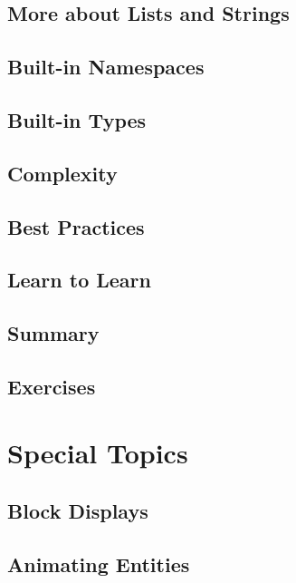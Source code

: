 \documentclass[oneside]{book}
\begin{document}
\section{More about Lists and Strings}
\blindtext

\section{Built-in Namespaces}
\blindtext

\section{Built-in Types}
\blindtext

\section{Complexity}
\blindtext

\section{Best Practices}
\blindtext

\section{Learn to Learn}
\blindtext

\section{Summary}
\blindtext

\section{Exercises}
\blindtext

\chapter{Special Topics}
\blindtext

\section{Block Displays}
\blindtext

\section{Animating Entities}
\blindtext
\end{document}
